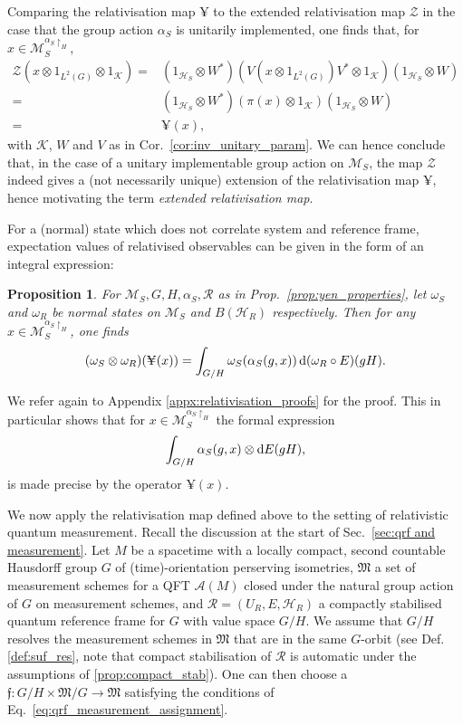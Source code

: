 \documentclass[sn-mathphys-num]{sn-jnl}%
\newcommand{\HH}{\mathcal{H}}
\newcommand{\KK}{\mathcal{K}}
\newcommand{\MM}{\mathcal{M}}
\newcommand{\Af}{\mathscr{A}}
\newcommand{\zen}{%
    \mathscr{Z}
}
\newcommand{\diff}{\textup{d}}
\numberwithin{equation}{section}
\theoremstyle{thmstyleone}%
\newtheorem{proposition}[theorem]{Proposition}%
\theoremstyle{thmstyletwo}%
\theoremstyle{thmstylethree}%
\begin{document}
    Comparing the relativisation map $\yen$ to the extended relativisation map $\zen$ in the case that the group action $\alpha_S$ is unitarily implemented, one finds that, for $x\in \MM_S^{\alpha_S\restriction_H}$,
    \begin{align}
        \zen(x\otimes 1_{L^2(G)}\otimes 1_{\KK})=&(1_{\HH_S}\otimes W^*)(V(x\otimes 1_{L^2(G)})V^*\otimes 1_{\KK})(1_{\HH_S}\otimes W)\nonumber\\
        =&(1_{\HH_S}\otimes W^*)(\pi(x)\otimes 1_{\KK})(1_{\HH_S}\otimes W)\nonumber\\
        =&\yen(x),
    \end{align}
    with $\KK$, $W$ and $V$ as in Cor.\ \ref{cor:inv_unitary_param}. We can hence conclude that, in the case of a unitary implementable group action on $\MM_S$, the map $\zen$ indeed gives a (not necessarily unique) extension of the relativisation map $\yen$, hence motivating the term \textit{extended relativisation map}.

    For a (normal) state which does not correlate system and reference frame, expectation values of relativised observables can be given in the form of an integral expression:
    \begin{proposition}
        \label{prop:rel_expect}
        For $\MM_S,G,H,\alpha_S,\mathcal{R}$ as in Prop.\ \ref{prop:yen_properties}, let $\omega_S$ and $\omega_R$ be normal states on $\MM_S$ and $B(\HH_R)$ respectively. Then for any $x\in\MM_S^{\alpha_S\restriction_H}$, one finds
        \begin{equation}
            (\omega_S\otimes\omega_R)(\yen(x))=\int_{G/H} \omega_S(\alpha_S(g,x))\,\diff(\omega_{R}\circ E)(gH).
        \end{equation}
    \end{proposition}
    We refer again to Appendix \ref{appx:relativisation_proofs} for the proof. This in particular shows that for $x\in \MM_S^{\alpha_S\restriction_H}$ the formal expression
    \begin{equation} \int_{G/H}\alpha_S(g,x)\otimes \diff E(gH),
    \end{equation}
    is made precise by the operator $\yen(x)$.
    
    We now apply the relativisation map defined above to the setting of relativistic quantum measurement. Recall the discussion at the start of Sec.\ \ref{sec:qrf and measurement}. Let $M$ be a spacetime with a locally compact, second countable Hausdorff group $G$ of (time)-orientation perserving isometries, $\mathfrak{M}$ a set of measurement schemes for a QFT $\Af(M)$ closed under the natural group action of $G$ on measurement schemes, and $\mathcal{R}=(U_R,E,\HH_R)$ a compactly stabilised quantum reference frame for $G$ with value space $G/H$. We assume that $G/H$ resolves the measurement schemes in $\mathfrak{M}$ that are in the same $G$-orbit (see Def. \ref{def:suf_res}, note that compact stabilisation of $\mathcal{R}$ is automatic under the assumptions of \ref{prop:compact_stab}). One can then choose a $\mathfrak{f}:G/H\times \mathfrak{M}/G\to \mathfrak{M}$ satisfying the conditions of Eq.\ \eqref{eq:qrf_measurement_assignment}.
    
\end{document}
